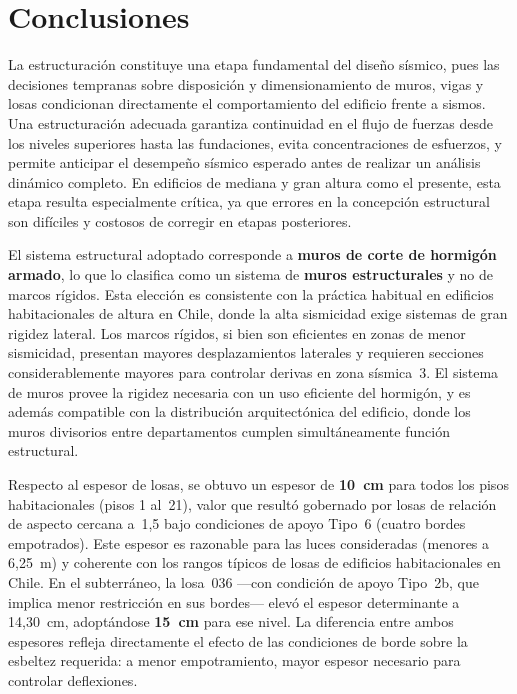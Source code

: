 \section{Conclusiones}

La estructuración constituye una etapa fundamental del diseño sísmico, pues 
las decisiones tempranas sobre disposición y dimensionamiento de muros, vigas 
y losas condicionan directamente el comportamiento del edificio frente a 
sismos. Una estructuración adecuada garantiza continuidad en el flujo de 
fuerzas desde los niveles superiores hasta las fundaciones, evita 
concentraciones de esfuerzos, y permite anticipar el desempeño sísmico 
esperado antes de realizar un análisis dinámico completo. En edificios de 
mediana y gran altura como el presente, esta etapa resulta especialmente 
crítica, ya que errores en la concepción estructural son difíciles y costosos 
de corregir en etapas posteriores.

El sistema estructural adoptado corresponde a \textbf{muros de corte de 
hormigón armado}, lo que lo clasifica como un sistema de \textbf{muros 
estructurales} y no de marcos rígidos. Esta elección es consistente con 
la práctica habitual en edificios habitacionales de altura en Chile, donde 
la alta sismicidad exige sistemas de gran rigidez lateral. Los marcos 
rígidos, si bien son eficientes en zonas de menor sismicidad, presentan 
mayores desplazamientos laterales y requieren secciones considerablemente 
mayores para controlar derivas en zona sísmica~3. El sistema de muros 
provee la rigidez necesaria con un uso eficiente del hormigón, y es 
además compatible con la distribución arquitectónica del edificio, donde 
los muros divisorios entre departamentos cumplen simultáneamente función 
estructural.

Respecto al espesor de losas, se obtuvo un espesor de \textbf{10~cm} para 
todos los pisos habitacionales (pisos 1 al~21), valor que resultó gobernado 
por losas de relación de aspecto cercana a~1,5 bajo condiciones de apoyo 
Tipo~6 (cuatro bordes empotrados). Este espesor es razonable para las luces 
consideradas (menores a 6,25~m) y coherente con los rangos típicos de losas 
de edificios habitacionales en Chile. En el subterráneo, la losa~036 —con 
condición de apoyo Tipo~2b, que implica menor restricción en sus bordes— 
elevó el espesor determinante a 14,30~cm, adoptándose \textbf{15~cm} para 
ese nivel. La diferencia entre ambos espesores refleja directamente el efecto 
de las condiciones de borde sobre la esbeltez requerida: a menor 
empotramiento, mayor espesor necesario para controlar deflexiones.

